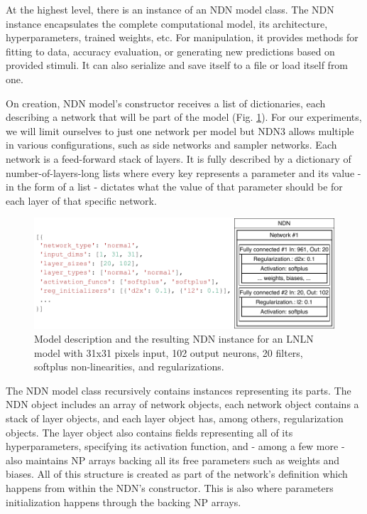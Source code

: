 At the highest level, there is an instance of an NDN model class. The NDN instance encapsulates the complete computational model, its architecture, hyperparameters, trained weights, etc. For manipulation, it provides methods for fitting to data, accuracy evaluation, or generating new predictions based on provided stimuli. It can also serialize and save itself to a file or load itself from one. 

On creation, NDN model’s constructor receives a list of dictionaries, each describing a network that will be part of the model (Fig. \ref{fig:3.1}). For our experiments, we will limit ourselves to just one network per model but NDN3 allows multiple in various configurations, such as side networks and sampler networks. Each network is a feed-forward stack of layers. It is fully described by a dictionary of number-of-layers-long lists where every key represents a parameter and its value - in the form of a list - dictates what the value of that parameter should be for each layer of that specific network.

\begin{figure}[h]
    \centering
    \includegraphics[width=1\textwidth]{../figures/03_NDN_1}
    \caption[NDN model description and subsequent architecture]{Model description and the resulting NDN instance for an LNLN model with 31x31 pixels input, 102 output neurons, 20 filters, softplus non-linearities, and regularizations.}
    \label{fig:3.1}
\end{figure}

The NDN model class recursively contains instances representing its parts. The NDN object includes an array of network objects, each network object contains a stack of layer objects, and each layer object has, among others, regularization objects. The layer object also contains fields representing all of its hyperparameters, specifying its activation function, and - among a few more - also maintains NP arrays backing all its free parameters such as weights and biases. All of this structure is created as part of the network's definition which happens from within the NDN’s constructor. This is also where parameters initialization happens through the backing NP arrays.

